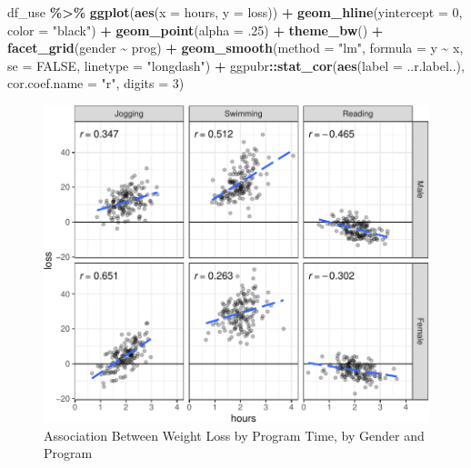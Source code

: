 \documentclass[
]{article}
\newenvironment{Shaded}{\begin{snugshade}}{\end{snugshade}}
\newcommand{\AttributeTok}[1]{\textcolor[rgb]{0.13,0.29,0.53}{#1}}
\newcommand{\ConstantTok}[1]{\textcolor[rgb]{0.56,0.35,0.01}{#1}}
\newcommand{\DecValTok}[1]{\textcolor[rgb]{0.00,0.00,0.81}{#1}}
\newcommand{\FunctionTok}[1]{\textcolor[rgb]{0.13,0.29,0.53}{\textbf{#1}}}
\newcommand{\NormalTok}[1]{#1}
\newcommand{\SpecialCharTok}[1]{\textcolor[rgb]{0.81,0.36,0.00}{\textbf{#1}}}
\newcommand{\StringTok}[1]{\textcolor[rgb]{0.31,0.60,0.02}{#1}}
\begin{document}
\begin{Shaded}
\begin{Highlighting}[]
\NormalTok{df\_use }\SpecialCharTok{\%\textgreater{}\%} 
  \FunctionTok{ggplot}\NormalTok{(}\FunctionTok{aes}\NormalTok{(}\AttributeTok{x =}\NormalTok{ hours,}
             \AttributeTok{y =}\NormalTok{ loss)) }\SpecialCharTok{+}
  \FunctionTok{geom\_hline}\NormalTok{(}\AttributeTok{yintercept =} \DecValTok{0}\NormalTok{, }\AttributeTok{color =} \StringTok{"black"}\NormalTok{) }\SpecialCharTok{+}
  \FunctionTok{geom\_point}\NormalTok{(}\AttributeTok{alpha =}\NormalTok{ .}\DecValTok{25}\NormalTok{) }\SpecialCharTok{+}
  \FunctionTok{theme\_bw}\NormalTok{() }\SpecialCharTok{+}
  \FunctionTok{facet\_grid}\NormalTok{(gender }\SpecialCharTok{\textasciitilde{}}\NormalTok{ prog) }\SpecialCharTok{+}
  \FunctionTok{geom\_smooth}\NormalTok{(}\AttributeTok{method =} \StringTok{"lm"}\NormalTok{,}
              \AttributeTok{formula =}\NormalTok{ y }\SpecialCharTok{\textasciitilde{}}\NormalTok{ x,}
              \AttributeTok{se =} \ConstantTok{FALSE}\NormalTok{,}
              \AttributeTok{linetype =} \StringTok{"longdash"}\NormalTok{) }\SpecialCharTok{+}
\NormalTok{  ggpubr}\SpecialCharTok{::}\FunctionTok{stat\_cor}\NormalTok{(}\FunctionTok{aes}\NormalTok{(}\AttributeTok{label =}\NormalTok{ ..r.label..),}
                   \AttributeTok{cor.coef.name =} \StringTok{"r"}\NormalTok{,}
                   \AttributeTok{digits =} \DecValTok{3}\NormalTok{)}
\end{Highlighting}
\end{Shaded}

\begin{figure}[hb]

\includegraphics{Appendix_ex_weightloss_files/figure-latex/unnamed-chunk-63-1} \hfill{}

\caption{Association Between Weight Loss by Program Time, by Gender and Program}\label{fig:unnamed-chunk-63}
\end{figure}
\end{document}
